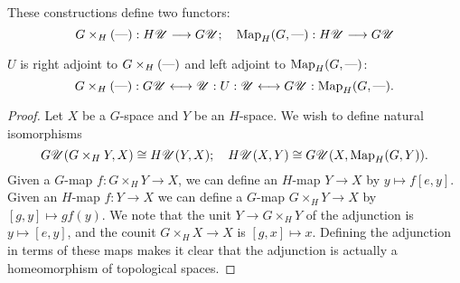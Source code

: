\documentclass[11pt]{article}
\begin{document}
\begin{FirstWeek}
These constructions define two functors:
\[G\times_H(\textup{---}):H\mathscr{U}\longrightarrow G\mathscr{U}; \hspace{10pt}
\textup{Map}_H(G,\textup{---}):H\mathscr{U}\longrightarrow G\mathscr{U}\]
\begin{thm*} $U$ is right adjoint to $G\times_H(\textup{---})$ and left adjoint to $\textup{Map}_H(G,\textup{---})$:
\[G\times_H(\textup{---}):G\mathscr{U}\longleftrightarrow\mathscr{U}: U:\mathscr{U}\longleftrightarrow G\mathscr{U}: \operatorname{Map}_H(G,\textup{---}).\]
\end{thm*}
\begin{proof} Let $X$ be a $G$-space and $Y$ be an $H$-space. We wish to define natural isomorphisms
\[G\mathscr{U}(G\times_H Y,X)\cong H\mathscr{U}(Y,X);\hspace{10pt}
H\mathscr{U}(X,Y)\cong G\mathscr{U}(X,\textup{Map}_H(G,Y)).\]
Given a $G$-map $f:G\times_H Y\to X$, we can define an $H$-map $Y\to X$ by $y\mapsto f[e,y]$. Given an $H$-map $f:Y\to X$ we can define a $G$-map $G\times_H Y\to X$ by $[g,y]\mapsto gf(y)$. We note that the unit $Y\to G\times_H Y$ of the adjunction is $y\mapsto [e,y]$, and the counit $G\times_H X\to X$ is $[g,x]\mapsto x$. Defining the adjunction in terms of these maps makes it clear that the adjunction is actually a homeomorphism of topological spaces.


\end{proof}
\end{FirstWeek}
\end{document}
